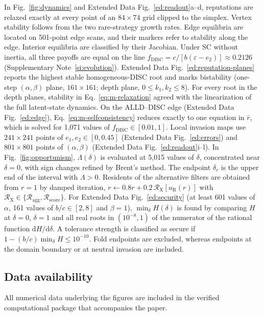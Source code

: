 \documentclass[fleqn,10pt]{wlscirep}
\newif\ifdraftnotes
\DeclareRobustCommand{\draftnote}[1]{%
  \ifdraftnotes{\color{red!60!black}\sffamily\footnotesize[#1]}\fi}
\newcommand{\Rmap}{\mathscr{R}}            %
\newcommand{\dd}{\mathrm{d}}
\newcommand{\DISC}{\mathrm{DISC}}
\theoremstyle{plain}
\begin{document}
In Fig.~\ref{fig:dynamics} and Extended Data Fig.~\ref{ed:readout}a--d, reputations are relaxed exactly at every point of an $84\times74$ grid clipped to the simplex. Vertex stability follows from the two rare-strategy growth rates. Edge equilibria are located on 501-point edge scans, and their markers refer to stability along the edge. Interior equilibria are classified by their Jacobian. Under SC without inertia, all three payoffs are equal on the line $f_{\DISC}=c/[b(\varepsilon-e_2)]\approx0.2126$ (Supplementary Note~\ref{si:evolution}). Extended Data Fig.~\ref{ed:reputation-planes} reports the highest stable homogeneous-DISC root and marks bistability (one-step $(\alpha,\beta)$ plane, $161\times161$; depth plane, $0\leq k_1,k_2\leq8$). For every root in the depth planes, stability in Eq.~\eqref{eq:m-relaxation} agreed with the linearization of the full latent-state dynamics. On the ALLD--DISC edge (Extended Data Fig.~\ref{ed:edge}), Eq.~\eqref{eq:m-selfconsistency} reduces exactly to one equation in $\bar r$, which is solved for 1,071 values of $f_{\DISC}\in[0.01,1]$. Local invasion maps use $241\times241$ points of $e_1,e_2\in[0,0.45]$ (Extended Data Fig.~\ref{ed:errors}) and $801\times801$ points of $(\alpha,\beta)$ (Extended Data Fig.~\ref{ed:readout}i--l). In Fig.~\ref{fig:opportunism}, $\Lambda(\delta)$ is evaluated at 5,015 values of $\delta$, concentrated near $\delta=0$, with sign changes refined by Brent's method. The endpoint $\delta_c$ is the upper end of the interval with $\Lambda>0$. Residents of the alternative filters are obtained from $r=1$ by damped iteration, $r\leftarrow0.8r+0.2\,\Rmap_{\mathrm X}[u_{\mathrm R}(r)]$ with $\Rmap_{\mathrm X}\in\{\Rmap_{\mathrm{agg}},\Rmap_{\mathrm{score}}\}$. For Extended Data Fig.~\ref{ed:security} (at least 601 values of $\alpha$, 161 values of $b/c\in[2,8]$ and $\beta=1$), $\min_\delta H(\delta)$ is found by comparing $H$ at $\delta=0$, $\delta=1$ and all real roots in $(10^{-8},1)$ of the numerator of the rational function $\dd H/\dd\delta$. A tolerance strength is classified as secure if $1-(b/c)\min_\delta H\leq10^{-10}$. Fold endpoints are excluded, whereas endpoints at the domain boundary or at neutral invasion are included.

\subsection*{Data availability}
All numerical data underlying the figures are included in the verified computational package that accompanies the paper. \draftnote{Repository and DOI to be added before submission.}
\end{document}
